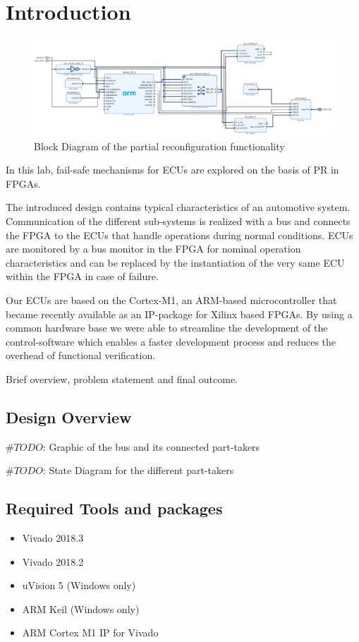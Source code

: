 \section{Introduction}
\begin{figure}[t]
    \centering
    \includegraphics[width=\textwidth]{figures/pr_blockDesign.pdf}
    \caption{Block Diagram of the partial reconfiguration functionality}\label{fig:prBlockDesign}
\end{figure}

In this lab, fail-safe mechanisms for \glspl{ECU} are explored on the basis of \gls{PR} in \glspl{FPGA}.

The introduced design contains typical characteristics of an automotive system.
Communication of the different sub-systems is realized with a bus and connects the \gls{FPGA} to the \glspl{ECU} that handle operations during normal conditions. 
\glspl{ECU} are monitored by a bus monitor in the \gls{FPGA} for nominal operation characteristics and can be replaced by the instantiation of the very same \gls{ECU} within the \gls{FPGA} in case of failure.

Our \glspl{ECU} are based on the Cortex-M1, an ARM-based microcontroller that became recently available as an \gls{IP}-package for Xilinx based \glspl{FPGA}.
By using a common hardware base we were able to streamline the development of the control-software which enables a faster development process and reduces the overhead of functional verification.
 
Brief overview, problem statement and final outcome.

\subsection{Design Overview}

$\#TODO$: Graphic of the bus and its connected part-takers

$\#TODO$: State Diagram for the different part-takers

\subsection{Required Tools and packages}

\begin{itemize}
    \item Vivado 2018.3
    \item Vivado 2018.2
    \item uVision 5 (Windows only)
    \item ARM Keil (Windows only)
    \item ARM Cortex M1 IP for Vivado
\end{itemize}
